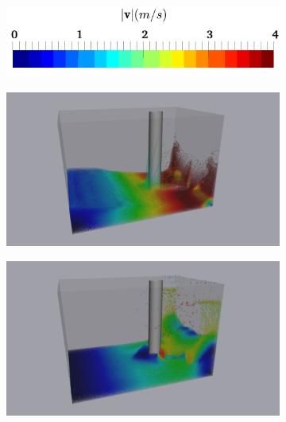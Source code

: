 \begin{figure}[H]
	\centering
	\begin{subfigure}{0.4 \textwidth}	
		\centering
		\includegraphics[width=1.0\textwidth]{images/CFD_DEM/colorBar.png}
	\end{subfigure}

	\begin{subfigure}{0.325 \textwidth}	
		\centering
		\includegraphics[width=1.0\textwidth]{images/CFD_DEM/lfluid20.png}
	\end{subfigure}
	\begin{subfigure}{0.325 \textwidth}
		\centering
		\includegraphics[width=1.0\textwidth]{images/CFD_DEM/lfluid40.png}
	\end{subfigure}
	\begin{subfigure}{0.325 \textwidth}

\end{subfigure}
\end{figure}
